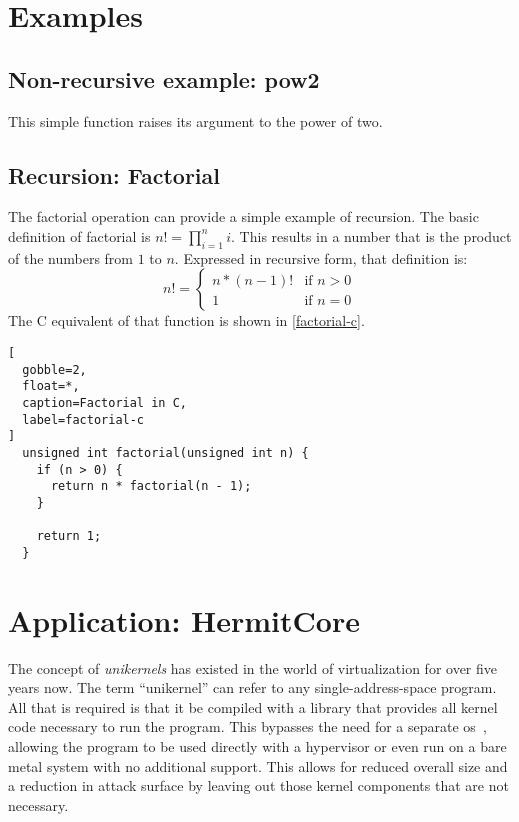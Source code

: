 
\section{Examples}\label{se:cfg_examples}
\subsection{Non-recursive example: pow2}
This simple function raises its argument to the power of two.


\subsection{Recursion: Factorial}
The factorial operation can provide a simple example of recursion.
The basic definition of factorial is $n!=\prod_{i=1}^n i$.%
This results in a number that is the product of the numbers from $1$ to $n$.
Expressed in recursive form, that definition is:
\begin{equation}
  n!=\begin{cases}
    n * (n - 1)! & \text{if }n > 0 \\
    1 & \text{if }n = 0
  \end{cases}
\end{equation}
The C equivalent of that function is shown in \cref{factorial-c}.
\begin{lstlisting}[
  gobble=2,
  float=*,
  caption=Factorial in C,
  label=factorial-c
]
  unsigned int factorial(unsigned int n) {
    if (n > 0) {
      return n * factorial(n - 1);
    }
    
    return 1;
  }
\end{lstlisting}


\section{Application: HermitCore}\label{se:cfg_application}
The concept of \emph{unikernels} has existed in the world of virtualization
for over five years now.
The term ``unikernel'' can refer to any single-address-space program.
All that is required is that it be compiled with a library
that provides all kernel code necessary to run the program.
This bypasses the need for a separate \ac{os}~\citep{madhavapeddy2014unikernels},
allowing the program to be used directly with a hypervisor
or even run on a bare metal system with no additional support.
This allows for reduced overall size and a reduction in attack surface
by leaving out those kernel components that are not necessary.

